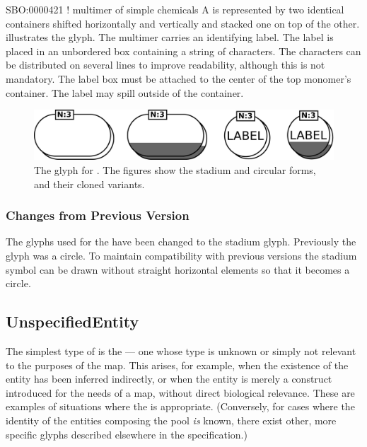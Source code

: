 \begin{glyphDescription}
\glyphSboTerm SBO:0000421 ! multimer of simple chemicals
\glyphContainer  A  is represented by two identical containers shifted horizontally and vertically and stacked one on top of the other.   illustrates the glyph.
\glyphLabel The multimer carries an identifying label.  The label is placed in an unbordered box containing a string of characters.  The characters can be distributed on several lines to improve readability, although this is not mandatory.  The label box must be attached to the center of the top monomer's container.  The label may spill outside of the container.
\end{glyphDescription}

\begin{figure}[H]
  \centering
  \includegraphics[scale = 0.3]{images/simpleChemicalMultimer}
  \caption{The \PD glyph for . The
    figures show the stadium and circular forms, and their cloned variants.}
  \label{fig:simpleChemicalMultimer}
\end{figure}

\subsubsection{Changes from Previous Version}

The glyphs used for the  have been changed
to the stadium glyph. Previously the glyph was a circle. To maintain
compatibility with previous versions the stadium symbol can be drawn
without straight horizontal elements so that it becomes a circle.

\subsection{UnspecifiedEntity}
\label{sec:unspecifiedEntity}

The simplest type of  is the
 --- one whose type is unknown or simply
not relevant to the purposes of the map.  This arises, for example,
when the existence of the entity has been inferred indirectly, or when
the entity is merely a construct introduced for the needs of a map,
without direct biological relevance.  These are examples of situations
where the  is appropriate.  (Conversely,
for cases where the identity of the entities composing the pool
\emph{is} known, there exist other, more specific glyphs described
elsewhere in the specification.)

